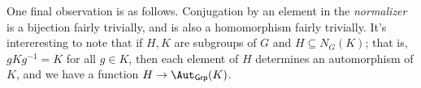 One final observation is as follows. Conjugation by an element in the \emph{normalizer} is a bijection fairly trivially, and is also a homomorphism fairly trivially. It's intereresting to note that if $H,K$ are subgroups of $G$ and $H\subseteq N_G(K)$; that is, $gKg^{-1} =K$ for all $g\in K$, then each element of $H$ determines an automorphism of $K$, and we have a function $H \to \Aut_{\mathsf{Grp} }(K) $.
